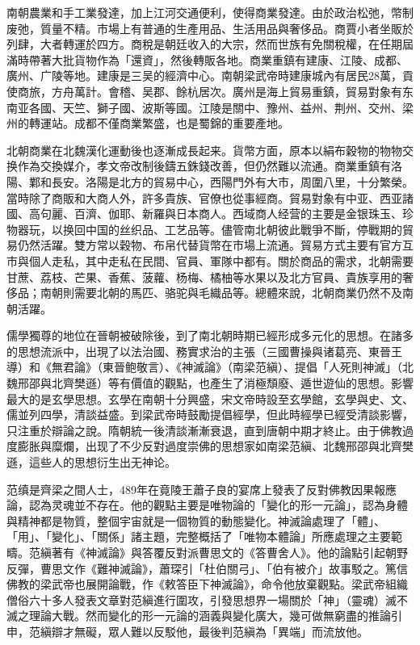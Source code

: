 南朝農業和手工業發達，加上江河交通便利，使得商業發達。由於政治松弛，幣制废弛，質量不精。市場上有普通的生產用品、生活用品與奢侈品。商賈小者坐販於列肆，大者轉運於四方。商稅是朝廷收入的大宗，然而世族有免關稅權，在任期屆滿時帶著大批貨物作為「還資」，然後轉販各地。商業重鎮有建康、江陵、成都、廣州、广陵等地。建康是三吴的經濟中心。南朝梁武帝時建康城內有居民28萬，貢使商旅，方舟萬計。會稽、吴郡、餘杭居次。廣州是海上貿易重鎮，貿易對象有东南亚各國、天竺、獅子國、波斯等國。江陵是關中、豫州、益州、荆州、交州、梁州的轉運站。成都不僅商業繁盛，也是蜀錦的重要產地。

北朝商業在北魏漢化運動後也逐漸成長起来。貨幣方面，原本以絹布穀物的物物交换作為交換媒介，孝文帝改制後鑄五銖錢改善，但仍然難以流通。商業重鎮有洛陽、鄴和長安。洛陽是北方的貿易中心，西陽門外有大市，周圍八里，十分繁榮。當時除了商販和大商人外，許多貴族、官僚也從事經商。貿易對象有中亚、西亚諸國、高句麗、百濟、伽耶、新羅與日本商人。西域商人经营的主要是金银珠玉、珍物器玩，以换回中国的丝织品、工艺品等。儘管南北朝彼此戰爭不斷，停戰期的貿易仍然活躍。雙方常以穀物、布帛代替貨幣在市場上流通。貿易方式主要有官方互市與個人走私，其中走私在民間、官員、軍隊中都有。關於商品的需求，北朝需要甘蔗、荔枝、芒果、香蕉、菠蘿、杨梅、橘柚等水果以及北方官員、貴族享用的奢侈品；南朝則需要北朝的馬匹、骆驼與毛織品等。總體來說，北朝商業仍然不及南朝活躍。

儒學獨尊的地位在晉朝被破除後，到了南北朝時期已經形成多元化的思想。在諸多的思想流派中，出現了以法治國、務實求治的主張（三國曹操與诸葛亮、東晉王導）和《無君論》（東晉鲍敬言）、《神滅論》（南梁范縝）、提倡「人死則神滅」（北魏邢邵與北齊樊遜）等有價值的觀點，也產生了消極頹廢、遁世遊仙的思想。影響最大的是玄學思想。玄學在南朝十分興盛，宋文帝時設至玄學館，玄學與史、文、儒並列四學，清談益盛。到梁武帝時鼓勵提倡經學，但此時經學已經受清談影響，只注重於辯論之說。隋朝統一後清談漸漸衰退，直到唐朝中期才終止。由于佛教過度膨胀與糜爛，出现了不少反對過度崇佛的思想家如南梁范縝、北魏邢邵與北齊樊遜，這些人的思想衍生出无神论。

范缜是齊梁之間人士，489年在竟陵王蕭子良的宴席上發表了反對佛教因果報應論，認為灵魂並不存在。他的觀點主要是唯物論的「變化的形一元論」，認為身體與精神都是物質，整個宇宙就是一個物質的動態變化。神滅論處理了「體」、「用」、「變化」、「關係」諸主題，完整概括了「唯物本體論」所應處理之主要範疇。范縝著有《神滅論》與答覆反對派曹思文的《答曹舍人》。他的論點引起朝野反彈，曹思文作《難神滅論》，蕭琛引「杜伯關弓」、「伯有被介」故事駁之。篤信佛教的梁武帝也展開論戰，作《敕答臣下神滅論》，命令他放棄觀點。梁武帝組織僧俗六十多人發表文章對范縝進行圍攻，引發思想界一場關於「神」（靈魂）滅不滅之理論大戰。然而變化的形一元論的涵義與變化廣大，幾可做無窮盡的推論引申，范縝辯才無礙，眾人難以反駁他，最後判范縝為「異端」而流放他。

